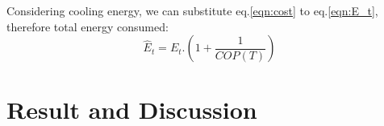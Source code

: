 \documentclass[JIP]{ipsj}
\begin{document}
Considering cooling energy, we can substitute eq.\ref{eqn:cost} to eq.\ref{eqn:E_t}, therefore total energy consumed: 
\begin{equation}
	\hat{E}_{t} = E_{t}.\left( 1+\frac{1}{COP(T)} \right)
\end{equation}




\section{Result and Discussion}\label{analysis}
\end{document}
